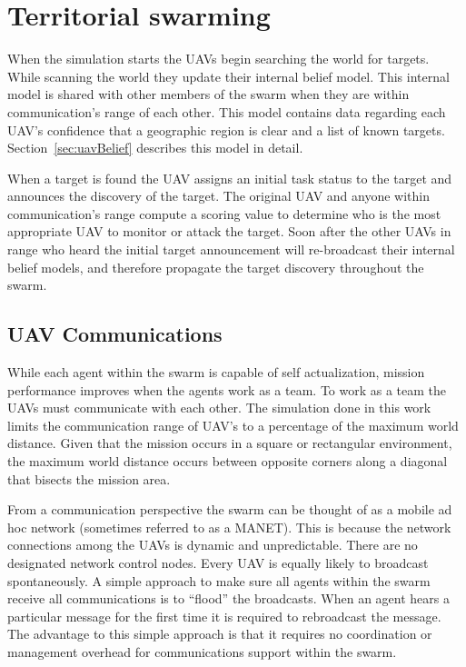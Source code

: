 \chapter{Territorial swarming}
\label{chap:myModel}
When the simulation starts the UAVs begin searching the world for targets.  While scanning the world they update their internal belief model.  This internal model is shared with other members of the swarm when they are within communication's range of each other.  This model contains data regarding each UAV's confidence that a geographic region is clear and a list of known targets.  Section~\ref{sec:uavBelief} describes this model in detail.

When a target is found the UAV assigns an initial task status to the target and announces the discovery of the target.  The original UAV and anyone within communication's range compute a scoring value to determine who is the most appropriate UAV to monitor or attack the target.  Soon after the other UAVs in range who heard the initial target announcement will re-broadcast their internal belief models, and therefore propagate the target discovery throughout the swarm.

\section{UAV Communications}
While each agent within the swarm is capable of self actualization, mission performance improves when the agents work as a team.  To work as a team the UAVs must communicate with each other.  The simulation done in this work limits the communication range of UAV's to a percentage of the maximum world distance.  Given that the mission occurs in a square or rectangular environment, the maximum world distance occurs between opposite corners along a diagonal that bisects the mission area.  %

From a communication perspective the swarm can be thought of as a mobile ad hoc network (sometimes referred to as a MANET).  This is because the network connections among the UAVs is dynamic and unpredictable.  There are no designated network control nodes.  Every UAV is equally likely to broadcast spontaneously.  A simple approach to make sure all agents within the swarm receive all communications is to ``flood'' the broadcasts.  When an agent hears a particular message for the first time it is required to rebroadcast the message.  The advantage to this simple approach is that it requires no coordination or management overhead for communications support within the swarm.

